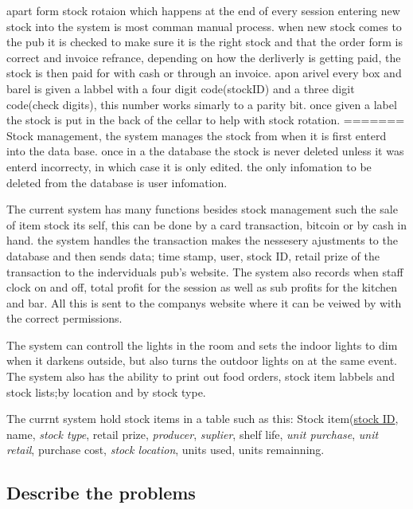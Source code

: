 apart form stock rotaion which happens at the end of every session entering new stock into the system is most comman manual process. when new stock comes to the pub it is checked to make sure it is the right stock and that the order form is correct and invoice refrance, depending on how the derliverly is getting paid, the stock is then paid for with cash or through an invoice. apon arivel every box and barel is given a labbel with a four digit code(stockID) and a three digit code(check digits), this number works simarly to a parity bit. once given a label the stock is put in the back of the cellar to help with stock rotation.
=======
Stock management, the system manages the stock from when it is first enterd into the data base. once in a the database the stock is never deleted unless it was enterd incorrecty, in which case it is only edited. the only infomation to be deleted from the database is user infomation.

The current system has many functions besides stock management such the sale of item stock its self, this can be done by a card transaction, bitcoin or by cash in hand. the system handles the transaction makes the nessesery ajustments to the database and then sends data; time stamp, user, stock ID, retail prize of the transaction to the inderviduals pub's website. The system also records when staff clock on and off, total profit for the session as well as sub profits for the kitchen and bar. All this is sent to the companys website where it can be veiwed by with the correct permissions.

The system can controll the lights in the room and sets the indoor lights to dim when it darkens outside, but also turns the outdoor lights on at the same event. The system also has the ability to print out food orders, stock item labbels and stock lists;by location and by stock type.

The currnt system hold stock items in a table such as this: Stock item(\underline{stock ID}, name, \emph{stock type}, retail prize, \emph{producer}, \emph{suplier}, shelf life, \emph{unit purchase}, \emph{unit retail}, purchase cost, \emph{stock location}, units used, units remainning.



\subsection{Describe the problems}

